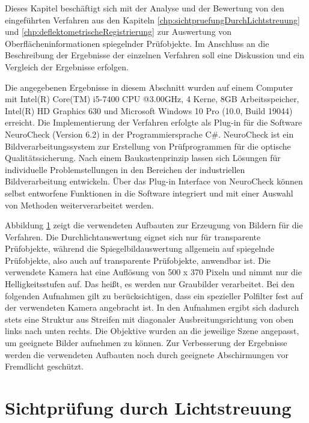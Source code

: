 Dieses Kapitel beschäftigt sich mit der Analyse und der Bewertung von den eingeführten Verfahren aus den Kapiteln \ref{chp:sichtpruefungDurchLichtstreuung} und \ref{chp:deflektometrischeRegistrierung} zur Auswertung von Oberflächeninformationen spiegelnder Prüfobjekte.
Im Anschluss an die Beschreibung der Ergebnisse der einzelnen Verfahren soll eine Diskussion und ein Vergleich der Ergebnisse erfolgen.

\p
Die angegebenen Ergebnisse in diesem Abschnitt wurden auf einem Computer mit Intel(R) Core(TM) i5-7400 CPU @3.00GHz, 4 Kerne, 8GB Arbeitsspeicher, Intel(R) HD Graphics 630 und Microsoft Windows 10 Pro (10.0, Build 19044) erreicht.
Die Implementierung der Verfahren erfolgte als Plug-in für die Software NeuroCheck (Version 6.2) in der Programmiersprache C\#.
NeuroCheck ist ein Bildverarbeitungssystem zur Erstellung von Prüfprogrammen für die optische Qualitätssicherung.
Nach einem Baukastenprinzip lassen sich Lösungen für individuelle Problemstellungen in den Bereichen der industriellen Bildverarbeitung entwickeln.
Über das Plug-in Interface von NeuroCheck können selbst entworfene Funktionen in die Software integriert und mit einer Auswahl von Methoden weiterverarbeitet werden.

{
	\begin{figure}[H]
		\centering
		
		\label{tikz:abbAufbauFotos}
	\end{figure}
}

\noindent
Abbildung \ref{tikz:abbAufbauFotos} zeigt die verwendeten Aufbauten zur Erzeugung von Bildern für die Verfahren.
Die Durchlichtauswertung eignet sich nur für transparente Prüfobjekte, während die Spiegelbildauswertung allgemein auf spiegelnde Prüfobjekte, also auch auf transparente Prüfobjekte, anwendbar ist.
Die verwendete Kamera hat eine Auflösung von 500 x 370 Pixeln und nimmt nur die Helligkeitsstufen auf. 
Das heißt, es werden nur Graubilder verarbeitet.
Bei den folgenden Aufnahmen gilt zu berücksichtigen, dass ein spezieller Polfilter fest auf der verwendeten Kamera angebracht ist.
In den Aufnahmen ergibt sich dadurch stets eine Struktur aus Streifen mit diagonaler Ausbreitungsrichtung von oben links nach unten rechts.
Die Objektive wurden an die jeweilige Szene angepasst, um geeignete Bilder aufnehmen zu können.
Zur Verbesserung der Ergebnisse werden die verwendeten Aufbauten noch durch geeignete Abschirmungen vor Fremdlicht geschützt.

{
	\FloatBarrier
    \section{Sichtprüfung durch Lichtstreuung}
    \label{sec:ergebnisseSichtpruefungDurchLichtstreuung}
    
}

